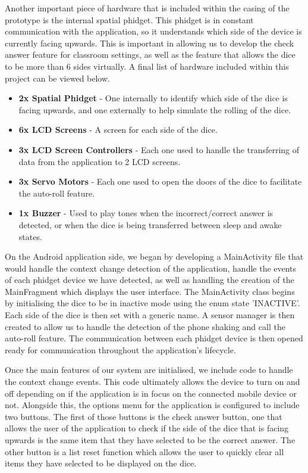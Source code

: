 \documentclass{sigchi}
\begin{document}
  Another important piece of hardware that is included within the casing of the prototype is the internal spatial phidget. This phidget is in constant communication with the application, so it understands which side of the device is currently facing upwards. This is important in allowing us to develop the check answer feature for classroom settings, as well as the feature that allows the dice to be more than 6 sides virtually. A final list of hardware included within this project can be viewed below.

  \begin{itemize}
    \item \textbf{2x Spatial Phidget} - One internally to identify which side of the dice is facing upwards, and one externally to help simulate the rolling of the dice.
    \item \textbf{6x LCD Screens} - A screen for each side of the dice.
    \item \textbf{3x LCD Screen Controllers} - Each one used to handle the transferring of data from the application to 2 LCD screens.
    \item \textbf{3x Servo Motors} - Each one used to open the doors of the dice to facilitate the auto-roll feature.
    \item \textbf{1x Buzzer} - Used to play tones when the incorrect/correct answer is detected, or when the dice is being transferred between sleep and awake states.
  \end{itemize}

  On the Android application side, we began by developing a MainActivity file that would handle the context change detection of the application, handle the events of each phidget device we have detected, as well as handling the creation of the MainFragment which displays the user interface. The MainActivity class begins by initialising the dice to be in inactive mode using the enum state 'INACTIVE'. Each side of the dice is then set with a generic name. A sensor manager is then created to allow us to handle the detection of the phone shaking and call the auto-roll feature. The communication between each phidget device is then opened ready for communication throughout the application's lifecycle. 

  Once the main features of our system are initialised, we include code to handle the context change events. This code ultimately allows the device to turn on and off depending on if the application is in focus on the connected mobile device or not. Alongside this, the options menu for the application is configured to include two buttons. The first of those buttons is the check answer button, one that allows the user of the application to check if the side of the dice that is facing upwards is the same item that they have selected to be the correct answer. The other button is a list reset function which allows the user to quickly clear all items they have selected to be displayed on the dice.
\end{document}
